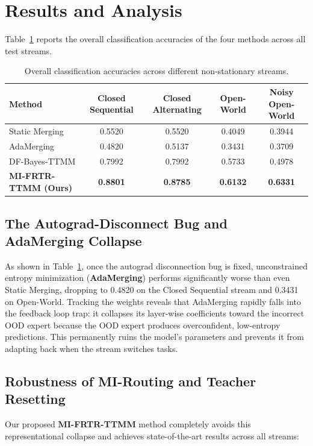 \documentclass{article}
\theoremstyle{plain}
\theoremstyle{definition}
\theoremstyle{remark}
\begin{document}
\section{Results and Analysis}
\label{submission-results}

Table~\ref{tab:main_results} reports the overall classification accuracies of the four methods across all test streams.

\begin{table}[t]
\caption{Overall classification accuracies across different non-stationary streams.}
\label{tab:main_results}
\centering
\begin{small}
\begin{sc}
\begin{tabular}{lcccc}
\toprule
Method & Closed Sequential & Closed Alternating & Open-World & Noisy Open-World \\
\midrule
Static Merging & 0.5520 & 0.5520 & 0.4049 & 0.3944 \\
AdaMerging & 0.4820 & 0.5137 & 0.3431 & 0.3709 \\
DF-Bayes-TTMM & 0.7992 & 0.7992 & 0.5733 & 0.4978 \\
\textbf{MI-FRTR-TTMM (Ours)} & \textbf{0.8801} & \textbf{0.8785} & \textbf{0.6132} & \textbf{0.6331} \\
\bottomrule
\end{tabular}
\end{sc}
\end{small}
\vspace{-10pt}
\end{table}

\subsection{The Autograd-Disconnect Bug and AdaMerging Collapse}
As shown in Table~\ref{tab:main_results}, once the autograd disconnection bug is fixed, unconstrained entropy minimization (\textbf{AdaMerging}) performs significantly worse than even Static Merging, dropping to 0.4820 on the Closed Sequential stream and 0.3431 on Open-World. Tracking the weights reveals that AdaMerging rapidly falls into the feedback loop trap: it collapses its layer-wise coefficients toward the incorrect OOD expert because the OOD expert produces overconfident, low-entropy predictions. This permanently ruins the model's parameters and prevents it from adapting back when the stream switches tasks.

\subsection{Robustness of MI-Routing and Teacher Resetting}
Our proposed \textbf{MI-FRTR-TTMM} method completely avoids this representational collapse and achieves state-of-the-art results across all streams:
\end{document}
